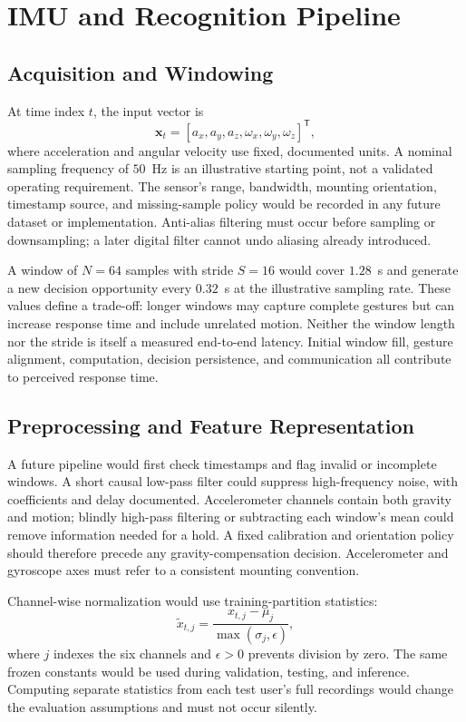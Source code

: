 \documentclass[conference]{IEEEtran}
\begin{document}
\section{IMU and Recognition Pipeline}
\subsection{Acquisition and Windowing}
At time index $t$, the input vector is
\begin{equation}
\mathbf{x}_t=[a_x,a_y,a_z,\omega_x,\omega_y,\omega_z]^\mathsf{T},
\end{equation}
where acceleration and angular velocity use fixed, documented units. A nominal sampling frequency of $50$~Hz is an illustrative starting point, not a validated operating requirement. The sensor's range, bandwidth, mounting orientation, timestamp source, and missing-sample policy would be recorded in any future dataset or implementation. Anti-alias filtering must occur before sampling or downsampling; a later digital filter cannot undo aliasing already introduced.

A window of $N=64$ samples with stride $S=16$ would cover $1.28$~s and generate a new decision opportunity every $0.32$~s at the illustrative sampling rate. These values define a trade-off: longer windows may capture complete gestures but can increase response time and include unrelated motion. Neither the window length nor the stride is itself a measured end-to-end latency. Initial window fill, gesture alignment, computation, decision persistence, and communication all contribute to perceived response time.

\subsection{Preprocessing and Feature Representation}
A future pipeline would first check timestamps and flag invalid or incomplete windows. A short causal low-pass filter could suppress high-frequency noise, with coefficients and delay documented. Accelerometer channels contain both gravity and motion; blindly high-pass filtering or subtracting each window's mean could remove information needed for a hold. A fixed calibration and orientation policy should therefore precede any gravity-compensation decision. Accelerometer and gyroscope axes must refer to a consistent mounting convention.

Channel-wise normalization would use training-partition statistics:
\begin{equation}
\widetilde{x}_{t,j}=\frac{x_{t,j}-\mu_j}{\max(\sigma_j,\epsilon)},
\end{equation}
where $j$ indexes the six channels and $\epsilon>0$ prevents division by zero. The same frozen constants would be used during validation, testing, and inference. Computing separate statistics from each test user's full recordings would change the evaluation assumptions and must not occur silently.
\end{document}
